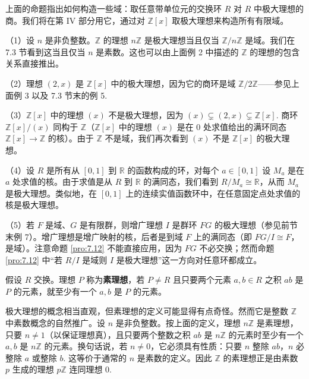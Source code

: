 上面的命题指出如何构造一些域：取任意带单位元的交换环 \(R\) 对 \(R\) 中极大理想的商。我们将在第 IV 部分用它，通过对 \(\mathbb{Z}[x]\) 取极大理想来构造所有有限域。

\begin{example}
（1）设 \(n\) 是非负整数。\(\mathbb{Z}\) 的理想 \(n\mathbb{Z}\) 是极大理想当且仅当 \(\mathbb{Z}/n\mathbb{Z}\) 是域。我们在 7.3 节看到这当且仅当 \(n\) 是素数。这也可以由上面例 2 中描述的 \(\mathbb{Z}\) 的理想的包含关系直接推出。

（2）理想 \((2, x)\) 是 \(\mathbb{Z}[x]\) 中的极大理想，因为它的商环是域 \(\mathbb{Z}/2\mathbb{Z}\)——参见上面例 3 以及 7.3 节末的例 5.

（3）\(\mathbb{Z}[x]\) 中的理想 \((x)\) 不是极大理想，因为 \((x) \subsetneq (2, x) \subsetneq \mathbb{Z}[x]\). 商环 \(\mathbb{Z}[x]/(x)\) 同构于 \(\mathbb{Z}\)（\(\mathbb{Z}[x]\) 中的理想 \((x)\) 是在 0 处求值给出的满环同态 \(\mathbb{Z}[x] \to \mathbb{Z}\) 的核）。由于 \(\mathbb{Z}\) 不是域，我们再次看到 \((x)\) 不是 \(\mathbb{Z}[x]\) 的极大理想。

（4）设 \(R\) 是所有从 \([0,1]\) 到 \(\mathbb{R}\) 的函数构成的环，对每个 \(a \in [0,1]\) 设 \(M_a\) 是在 \(a\) 处求值的核。由于求值是从 \(R\) 到 \(\mathbb{R}\) 的满同态，我们看到 \(R/M_a \cong \mathbb{R}\)，从而 \(M_a\) 是极大理想。类似地，在 \([0,1]\) 上的连续实值函数环中，在任意固定点处求值的核是极大理想。

（5）若 \(F\) 是域、\(G\) 是有限群，则增广理想 \(I\) 是群环 \(FG\) 的极大理想（参见前节末例 7）。增广理想是增广映射的核，后者是到域 \(F\) 上的满同态（即 \(FG/I \cong F\)，是域）。注意命题 \ref{pro:7.12} 不能直接应用，因为 \(FG\) 不必交换；然而命题 \ref{pro:7.12} 中“若 \(R/I\) 是域则 \(I\) 是极大理想”这一方向对任意环都成立。
\end{example}

\begin{definition}
假设 \(R\) 交换。理想 \(P\) 称为\textbf{素理想}，若 \(P \neq R\) 且只要两个元素 \(a, b \in R\) 之积 \(ab\) 是 \(P\) 的元素，就至少有一个 \(a, b\) 是 \(P\) 的元素。
\end{definition}

极大理想的概念相当直观，但素理想的定义可能显得有点奇怪。然而它是整数 \(\mathbb{Z}\) 中素数概念的自然推广。设 \(n\) 是非负整数。按上面的定义，理想 \(n\mathbb{Z}\) 是素理想，只要 \(n \neq 1\)（以保证理想真），且只要两个整数之积 \(ab\) 是 \(n\mathbb{Z}\) 的元素时至少有一个 \(a, b\) 是 \(n\mathbb{Z}\) 的元素。换句话说，若 \(n \neq 0\)，它必须具有性质：只要 \(n\) 整除 \(ab\)，\(n\) 必整除 \(a\) 或整除 \(b\). 这等价于通常的 \(n\) 是素数的定义。因此 \(\mathbb{Z}\) 的素理想正是由素数 \(p\) 生成的理想 \(p\mathbb{Z}\) 连同理想 0.

